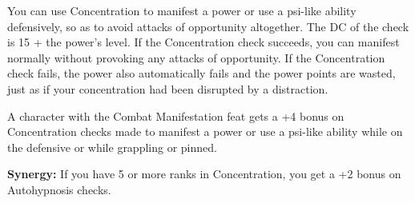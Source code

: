 You can use Concentration to manifest a power or use a psi-like ability defensively, so as to avoid attacks of opportunity altogether. The DC of the check is 15 + the power’s level. If the Concentration check succeeds, you can manifest normally without provoking any attacks of opportunity. If the Concentration check fails, the power also automatically fails and the power points are wasted, just as if your concentration had been disrupted by a distraction.

A character with the Combat Manifestation feat gets a +4 bonus on Concentration checks made to manifest a power or use a psi-like ability while on the defensive or while grappling or pinned.

\textbf{Synergy:} If you have 5 or more ranks in Concentration, you get a +2 bonus on Autohypnosis checks.